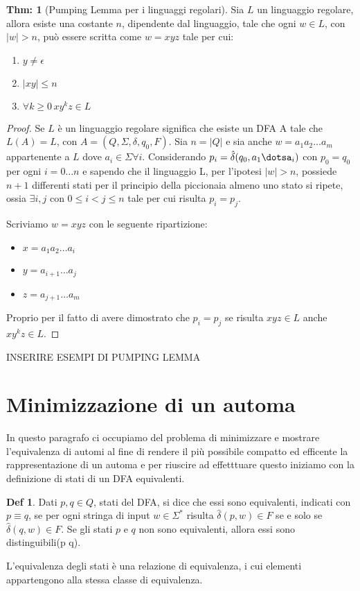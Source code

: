 \documentclass[a4paper]{book}
\theoremstyle{definition}%
\newtheorem*{defi}{Def}%
\newtheorem{thm}{Thm:}[chapter]
\begin{document}
\begin{thm}[Pumping Lemma per i linguaggi regolari]
  Sia $L$ un linguaggio regolare, allora esiste una costante $n$, dipendente dal linguaggio, tale che ogni $w \in L$, con $|w| > n$,
  può essere scritta come $w = xyz$ tale per cui:
  \begin{enumerate}
  \item $y \neq \epsilon$
  \item $|xy| \leq n$
  \item $\forall k \geq 0 \, xy^kz \in L$
  \end{enumerate}
\end{thm}
\begin{proof}
  Se $L$ è un linguaggio regolare significa che esiste un DFA A tale che $L(A) = L$, con $A = (Q, \Sigma, \delta, q_0, F)$.\newline
  Sia $n = |Q|$ e sia anche $w = a_1a_2\dots a_m $ appartenente a $L$ dove $a_i \in \Sigma \forall i$.\newline
  Considerando $p_i = \hat{\delta}(q_0, a_1\dotsa_i)$ con $p_0 = q_0$ per ogni $i = 0\dots n$ e sapendo che il linguaggio L,
  per l'ipotesi $|w| > n$, possiede $n + 1$ differenti stati per il principio della piccionaia almeno uno stato si ripete,
  ossia $\exists i,j$ con $0 \leq i < j \leq n$ tale per cui risulta $p_i = p_j$.

  Scriviamo $w = xyz$ con le seguente ripartizione:
  \begin{itemize}
  \item $x = a_1a_2 \dots a_i$
  \item $y = a_{i+1} \dots a_j$
  \item $z = a_{j+1} \dots a_m$
  \end{itemize}
  Proprio per il fatto di avere dimostrato che $p_i = p_j$ se risulta $xyz \in L$ anche $xy^kz \in L$.
\end{proof}
INSERIRE ESEMPI DI PUMPING LEMMA

\section{Minimizzazione di un automa}
In questo paragrafo ci occupiamo del problema di minimizzare e mostrare l'equivalenza di automi al fine di rendere il più
possibile compatto ed efficente la rappresentazione di un automa e per riuscire ad effetttuare questo iniziamo con la
definizione di stati di un DFA equivalenti.
\begin{defi}
  Dati $p,q \in Q$, stati del DFA, si dice che essi sono equivalenti, indicati con $p \equiv q$, se per ogni stringa di input $w \in \Sigma^*$
  risulta $\hat{\delta}(p, w) \in F$ se e solo se $\hat{\delta}(q, w) \in F$.\newline
  Se gli stati $p$ e $q$ non sono equivalenti, allora essi sono distinguibili(p \not \equiv q).
\end{defi}
L'equivalenza degli stati è una relazione di equivalenza, i cui elementi appartengono alla stessa classe di equivalenza.
\end{document}
